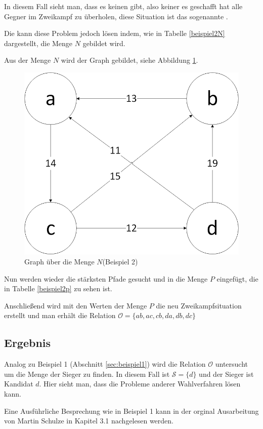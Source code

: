 In diesem Fall sieht man, dass es keinen \condorcetSieger gibt, also keiner es geschafft hat alle Gegner im Zweikampf zu überholen, diese Situation ist das sogenannte \condorcetParadox. \citep{EnricoSchoebel2018}

\newpage
Die \schulze kann diese Problem jedoch lösen indem, wie in Tabelle \ref{beispiel2N} dargestellt, die Menge $N$ gebildet wird.



Aus der Menge $N$ wird der Graph gebildet, siehe Abbildung \ref{fig:graph2}.

\begin{figure}[!h]
\centering
\includegraphics[scale=0.5]{Bilder/Beispiel2_Graph.png}
\caption{Graph über die Menge $N$(Beispiel 2)}
\label{fig:graph2}
\end{figure}

Nun werden wieder die stärksten Pfade gesucht und in die Menge $P$ eingefügt, die in Tabelle \ref{beispiel2p} zu sehen ist.



Anschließend wird mit den Werten der Menge $P$ die neu Zweikampfsituation erstellt und man erhält die Relation $\mathcal{O} = \{ ab,ac,cb,da,db,dc \}$


\subsection{Ergebnis} 
\label{sec:ergebnis2}
Analog zu Beispiel 1 (Abschnitt \ref{sec:beispiel1}) wird die Relation $\mathcal{O}$ untersucht um die Menge der Sieger zu finden. In diesem Fall ist $\mathcal{S}=\{d\}$  und der Sieger ist Kandidat $d$. Hier sieht man, dass die \schulze Probleme anderer Wahlverfahren lösen kann.

Eine Ausführliche Besprechung wie in Beispiel 1 kann in der orginal Ausarbeitung von Martin Schulze in Kapitel 3.1 nachgelesen werden. \citep{Schulze2017}
